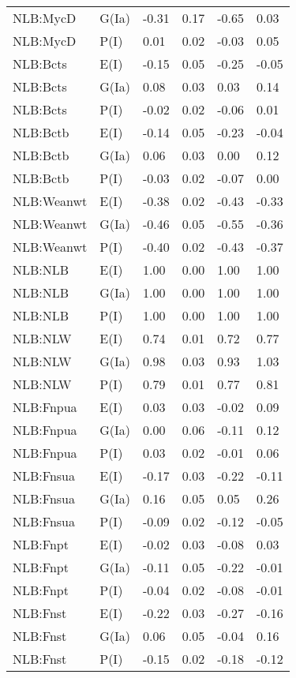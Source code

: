 \begin{center}
\begin{longtable}{|p{1.1in}|p{0.7in}|p{0.7in}|p{0.6in}|p{0.6in}|p{0.6in}|}
  NLB:MycD & G(Ia) & -0.31 & 0.17 & -0.65 & 0.03 \\ 
  NLB:MycD & P(I) & 0.01 & 0.02 & -0.03 & 0.05 \\ 
  NLB:Bcts & E(I) & -0.15 & 0.05 & -0.25 & -0.05 \\ 
  NLB:Bcts & G(Ia) & 0.08 & 0.03 & 0.03 & 0.14 \\ 
  NLB:Bcts & P(I) & -0.02 & 0.02 & -0.06 & 0.01 \\ 
  NLB:Bctb & E(I) & -0.14 & 0.05 & -0.23 & -0.04 \\ 
  NLB:Bctb & G(Ia) & 0.06 & 0.03 & 0.00 & 0.12 \\ 
  NLB:Bctb & P(I) & -0.03 & 0.02 & -0.07 & 0.00 \\ 
  NLB:Weanwt & E(I) & -0.38 & 0.02 & -0.43 & -0.33 \\ 
  NLB:Weanwt & G(Ia) & -0.46 & 0.05 & -0.55 & -0.36 \\ 
  NLB:Weanwt & P(I) & -0.40 & 0.02 & -0.43 & -0.37 \\ 
  NLB:NLB & E(I) & 1.00 & 0.00 & 1.00 & 1.00 \\ 
  NLB:NLB & G(Ia) & 1.00 & 0.00 & 1.00 & 1.00 \\ 
  NLB:NLB & P(I) & 1.00 & 0.00 & 1.00 & 1.00 \\ 
  NLB:NLW & E(I) & 0.74 & 0.01 & 0.72 & 0.77 \\ 
  NLB:NLW & G(Ia) & 0.98 & 0.03 & 0.93 & 1.03 \\ 
  NLB:NLW & P(I) & 0.79 & 0.01 & 0.77 & 0.81 \\ 
  NLB:Fnpua & E(I) & 0.03 & 0.03 & -0.02 & 0.09 \\ 
  NLB:Fnpua & G(Ia) & 0.00 & 0.06 & -0.11 & 0.12 \\ 
  NLB:Fnpua & P(I) & 0.03 & 0.02 & -0.01 & 0.06 \\ 
  NLB:Fnsua & E(I) & -0.17 & 0.03 & -0.22 & -0.11 \\ 
  NLB:Fnsua & G(Ia) & 0.16 & 0.05 & 0.05 & 0.26 \\ 
  NLB:Fnsua & P(I) & -0.09 & 0.02 & -0.12 & -0.05 \\ 
  NLB:Fnpt & E(I) & -0.02 & 0.03 & -0.08 & 0.03 \\ 
  NLB:Fnpt & G(Ia) & -0.11 & 0.05 & -0.22 & -0.01 \\ 
  NLB:Fnpt & P(I) & -0.04 & 0.02 & -0.08 & -0.01 \\ 
  NLB:Fnst & E(I) & -0.22 & 0.03 & -0.27 & -0.16 \\ 
  NLB:Fnst & G(Ia) & 0.06 & 0.05 & -0.04 & 0.16 \\ 
  NLB:Fnst & P(I) & -0.15 & 0.02 & -0.18 & -0.12 \\ 

\end{longtable}
\end{center}
